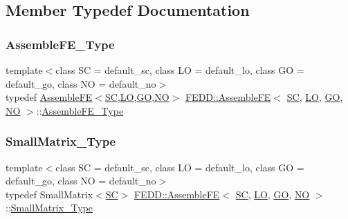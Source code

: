 \subsection{Member Typedef Documentation}
\mbox{\label{classFEDD_1_1AssembleFE_ab2c8bb1fd65dfcf7899a7c4a4a8a4021}} 
\subsubsection{\texorpdfstring{Assemble\+F\+E\+\_\+\+Type}{AssembleFE\_Type}}
{\footnotesize\ttfamily template$<$class SC  = default\+\_\+sc, class LO  = default\+\_\+lo, class GO  = default\+\_\+go, class NO  = default\+\_\+no$>$ \\
typedef \hyperlink{classFEDD_1_1AssembleFE}{Assemble\+FE}$<$\hyperlink{fe__test__laplace_8cpp_a79c7e86a57edbb2a5a53242bcd04e41e}{SC},\hyperlink{fe__test__laplace_8cpp_ad6a38c9f07d3fd633eefca5bccad8410}{LO},\hyperlink{fe__test__laplace_8cpp_afa2946b509009b4f45eb04bd8c5b27d9}{GO},\hyperlink{fe__test__laplace_8cpp_a5e24f37b28787429872b6ecb1d0417ce}{NO}$>$ \hyperlink{classFEDD_1_1AssembleFE}{F\+E\+D\+D\+::\+Assemble\+FE}$<$ \hyperlink{fe__test__laplace_8cpp_a79c7e86a57edbb2a5a53242bcd04e41e}{SC}, \hyperlink{fe__test__laplace_8cpp_ad6a38c9f07d3fd633eefca5bccad8410}{LO}, \hyperlink{fe__test__laplace_8cpp_afa2946b509009b4f45eb04bd8c5b27d9}{GO}, \hyperlink{fe__test__laplace_8cpp_a5e24f37b28787429872b6ecb1d0417ce}{NO} $>$\+::\hyperlink{classFEDD_1_1AssembleFE_ab2c8bb1fd65dfcf7899a7c4a4a8a4021}{Assemble\+F\+E\+\_\+\+Type}}

\mbox{\label{classFEDD_1_1AssembleFE_a8b8c588ba0cfaa200a74215f19e62722}} 
\subsubsection{\texorpdfstring{Small\+Matrix\+\_\+\+Type}{SmallMatrix\_Type}}
{\footnotesize\ttfamily template$<$class SC  = default\+\_\+sc, class LO  = default\+\_\+lo, class GO  = default\+\_\+go, class NO  = default\+\_\+no$>$ \\
typedef Small\+Matrix$<$\hyperlink{fe__test__laplace_8cpp_a79c7e86a57edbb2a5a53242bcd04e41e}{SC}$>$ \hyperlink{classFEDD_1_1AssembleFE}{F\+E\+D\+D\+::\+Assemble\+FE}$<$ \hyperlink{fe__test__laplace_8cpp_a79c7e86a57edbb2a5a53242bcd04e41e}{SC}, \hyperlink{fe__test__laplace_8cpp_ad6a38c9f07d3fd633eefca5bccad8410}{LO}, \hyperlink{fe__test__laplace_8cpp_afa2946b509009b4f45eb04bd8c5b27d9}{GO}, \hyperlink{fe__test__laplace_8cpp_a5e24f37b28787429872b6ecb1d0417ce}{NO} $>$\+::\hyperlink{classFEDD_1_1AssembleFE_a8b8c588ba0cfaa200a74215f19e62722}{Small\+Matrix\+\_\+\+Type}}

